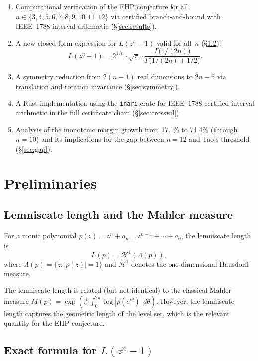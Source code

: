 \documentclass[11pt]{article}
\theoremstyle{plain}
\theoremstyle{definition}
\theoremstyle{remark}
\begin{document}
\begin{enumerate}[nosep]
\item Computational verification of the EHP conjecture for all $n \in \{3, 4, 5, 6, 7, 8, 9, 10, 11, 12\}$ via certified branch-and-bound with IEEE~1788 interval arithmetic (\S\ref{sec:results}).
\item A new closed-form expression for $L(z^n - 1)$ valid for all~$n$ (\S\ref{sec:formula}):
\[
L(z^n - 1) = 2^{1/n} \cdot \sqrt{\pi} \cdot \frac{\Gamma\bigl(1/(2n)\bigr)}{\Gamma\bigl(1/(2n) + 1/2\bigr)}.
\]
\item A symmetry reduction from $2(n-1)$ real dimensions to $2n-5$ via translation and rotation invariance (\S\ref{sec:symmetry}).
\item A Rust implementation using the \texttt{inari} crate for IEEE~1788 certified interval arithmetic in the full certificate chain (\S\ref{sec:crossval}).
\item Analysis of the monotonic margin growth from 17.1\% to 71.4\% (through $n=10$) and its implications for the gap between $n = 12$ and Tao's threshold (\S\ref{sec:gap}).
\end{enumerate}

\section{Preliminaries}

\subsection{Lemniscate length and the Mahler measure}

For a monic polynomial $p(z) = z^n + a_{n-1}z^{n-1} + \cdots + a_0$, the lemniscate length is
\[
L(p) = \mathcal{H}^1(\Lambda(p)),
\]
where $\Lambda(p) = \{z : |p(z)| = 1\}$ and $\mathcal{H}^1$ denotes the one-dimensional Hausdorff measure.

The lemniscate length is related (but not identical) to the classical Mahler measure $M(p) = \exp\!\left(\frac{1}{2\pi}\int_0^{2\pi} \log|p(e^{i\theta})|\,d\theta\right)$. However, the lemniscate length captures the geometric length of the level set, which is the relevant quantity for the EHP conjecture.

\subsection{Exact formula for $L(z^n - 1)$}
\label{sec:formula}
\end{document}

